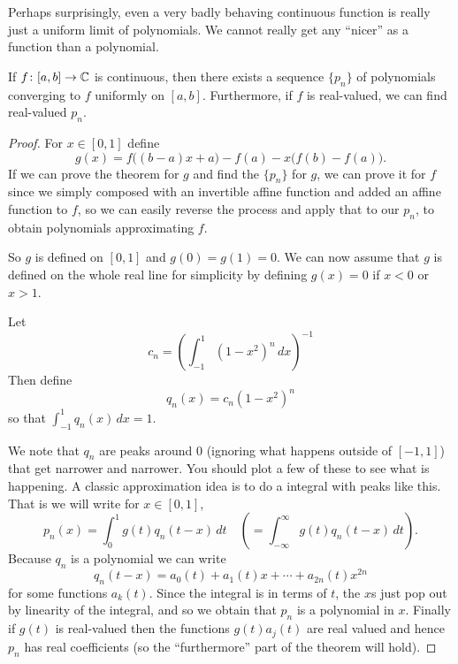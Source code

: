 Perhaps surprisingly, even a very badly behaving continuous function is really
just a uniform limit of polynomials.  We cannot really get any ``nicer'' as
a function than a polynomial.

\begin{thm}
If $f \colon [a,b] \to {\mathbb{C}}$ is continuous, then there exists a sequence $\{
p_n \}$ of polynomials converging to $f$ uniformly on $[a,b]$.
Furthermore, if $f$ is real-valued, we can find real-valued $p_n$.
\end{thm}

\begin{proof}
For $x \in [0,1]$ define
\begin{equation*}
g(x) = f\bigl((b-a)x+a\bigr)-f(a) - x\bigl(f(b)-f(a)\bigr) .
\end{equation*}
If we can prove the theorem for $g$ and find the $\{ p_n \}$ for $g$,
we can prove it for $f$ since we simply
composed with an invertible affine function and added an affine
function to $f$, so we can easily reverse the process and apply that to our
$p_n$, to obtain polynomials approximating $f$.

So $g$ is defined on $[0,1]$ and $g(0)=g(1)=0$.  We can now assume that
$g$ is defined on the whole real line for simplicity by defining
$g(x) = 0$ if $x < 0$ or $x > 1$.

Let
\begin{equation*}
c_n = {\left( \int_{-1}^1 {(1-x^2)}^n\,dx \right)}^{-1}
\end{equation*}
Then define
\begin{equation*}
q_n(x) = c_n (1-x^2)^n
\end{equation*}
so that $\int_{-1}^1 q_n(x)\,dx = 1$.

We note that $q_n$ are peaks around 0 (ignoring what happens outside
of $[-1,1]$) that get narrower and narrower.
You should plot a few of these
to see what is happening.  A classic approximation idea
is to do a \emph{} integral with peaks like this.  That is we will
write for $x \in [0,1]$,
\begin{equation*}
p_n(x) = \int_{0}^1 g(t)q_n(t-x) \,dt \quad \left( = \int_{-\infty}^\infty
g(t)q_n(t-x) \,dt \right) .
\end{equation*}
Because $q_n$ is a polynomial we can write
\begin{equation*}
q_n(t-x) = a_0(t) + a_1(t)x + \cdots + a_{2n}(t) x^{2n}
\end{equation*}
for some functions $a_k(t)$.
Since the integral is in terms of $t$, the $x$s just pop out
by linearity of the integral,
and so we obtain that $p_n$ is a polynomial in $x$.
Finally if $g(t)$ is real-valued then the functions $g(t)a_j(t)$ are real
valued and hence $p_n$ has real coefficients (so the ``furthermore'' part of the
theorem will hold).


\end{proof}
